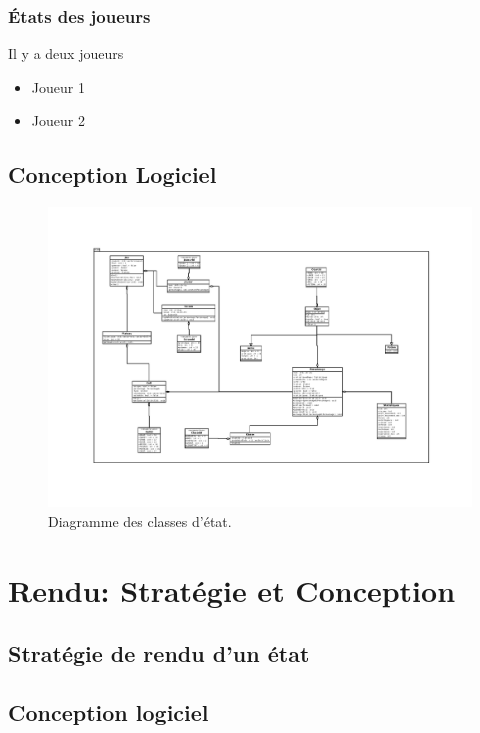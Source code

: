 \documentclass[a4paper,12pt]{article}
\begin{document}
\subsubsection{États des joueurs}
Il y a deux joueurs
\begin{itemize}
\item Joueur 1
\item Joueur 2
\end{itemize}
\subsection{Conception Logiciel}
\newpage
\begin{landscape}
\begin{figure}[p]
\includegraphics[width=0.9\paperheight]{state.pdf}
\caption{\label{uml:state}Diagramme des classes d'état.} 
\end{figure}
\end{landscape}

\clearpage
\section{Rendu: Stratégie et Conception}

\subsection{Stratégie de rendu d'un état}


\subsection{Conception logiciel}
\end{document}
